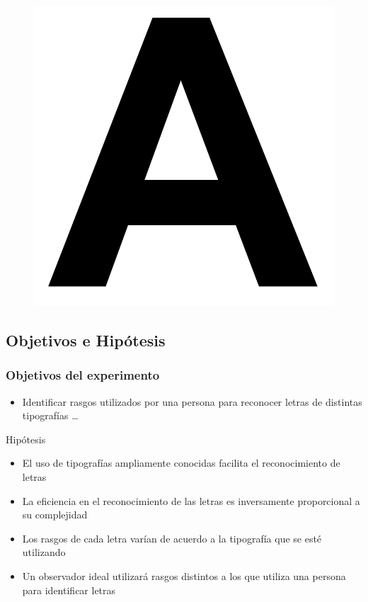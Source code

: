 \documentclass{beamer}
\begin{document}
\begin{frame}
 \begin{figure}
  \includegraphics[scale=.2]{graficos/letra.png}
 \end{figure}
\end{frame}

\subsection{Objetivos e Hip\'otesis}
\begin{frame}
  \frametitle{Objetivos del experimento}
  \begin{itemize}
    \item Identificar rasgos utilizados por una persona para reconocer letras de distintas tipograf\'ias  \ldots 
\end{itemize}

\begin{block}{Hip\'otesis}
 \begin{itemize}
      \item El uso de tipograf\'ias ampliamente conocidas facilita el reconocimiento de letras 
      \item La eficiencia en el reconocimiento de las letras es inversamente proporcional a su complejidad 
      \item Los rasgos de cada letra var\'ian de acuerdo a la tipograf\'ia que se est\'e utilizando 
      \item Un observador ideal utilizar\'a rasgos distintos a los que utiliza una persona para identificar letras	
    \end{itemize}
\end{block}

\end{frame}
\end{document}
